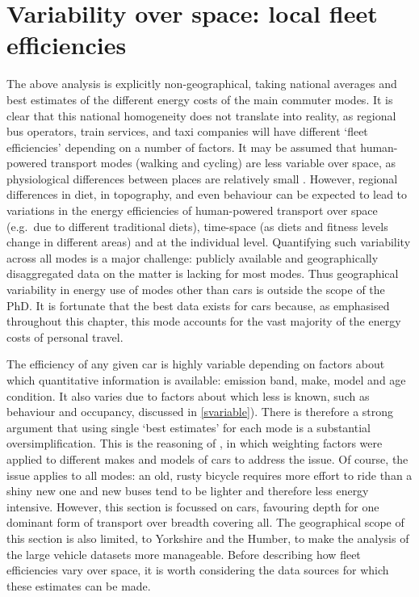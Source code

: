 \documentclass[a4paper, 11pt, twoside]{Thesis}
\begin{document}
\section{Variability over space: local fleet efficiencies}
\label{seffspace}
The above analysis is explicitly
non-geographical, taking national averages and best estimates of the different
energy costs of the main commuter modes. It is clear that this national
homogeneity does not translate into reality, as regional bus operators,
train services, and taxi companies will have different `fleet efficiencies'
depending on a number of factors. It may be assumed that human-powered transport
modes (walking and cycling) are less variable over space, as physiological
differences between places are relatively small \citep{hayter1992variability,
Shetty2007}. However, regional differences in
diet, in topography, and even behaviour can be expected to lead to
variations in the energy efficiencies of human-powered transport over space
(e.g.~due to different traditional diets), time-space (as diets and fitness
levels change in different areas) and at the individual level. Quantifying
such variability across all modes is a major challenge: publicly
available and geographically disaggregated data on the matter is lacking for
most modes. Thus geographical variability in energy use of modes other
than cars is outside the scope of the PhD. It is fortunate that the best data
exists for cars because, as emphasised throughout this chapter, this mode
accounts for
the vast majority of the energy costs of personal travel. 


The efficiency of any given car is highly variable depending on
factors about which quantitative information is available: emission band, make,
model and age condition. It also varies due to factors about which
less is known, such as
behaviour and occupancy, discussed in \cref{svariable}). There is therefore a
strong argument that using single `best estimates' for each mode is a
substantial oversimplification.
This is the reasoning of \citet{Leith2007}, in which weighting
factors were applied to different makes and models of cars to address the issue.
Of course,
the issue applies to all modes: an old, rusty bicycle requires more effort
to ride than a shiny new one and new buses tend to be lighter and therefore
less energy intensive. However, this section is focussed on cars, favouring
depth for one dominant form of transport over breadth covering all.
The geographical scope of this section is also limited, to Yorkshire and the
Humber, to make the analysis of the large vehicle datasets more manageable.
Before describing how fleet efficiencies vary over space, it is worth
considering the data sources for which these estimates can be made.
\end{document}
